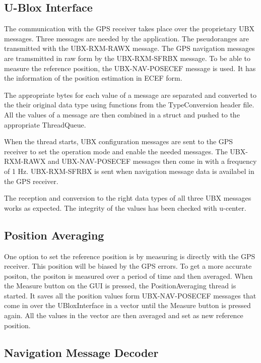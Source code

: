 \subsection{U-Blox Interface}

The communication with the GPS receiver takes place over the proprietary UBX messages.
Three messages are needed by the application.
The pseudoranges are transmitted with the UBX-RXM-RAWX message.
The GPS navigation messages are tramsmitted in raw form by the UBX-RXM-SFRBX message.
To be able to measure the reference position, the UBX-NAV-POSECEF message is used.
It has the information of the position estimation in ECEF form.

The appropriate bytes for each value of a message are separated and converted to the their original data type using functions from the TypeConversion header file.
All the values of a message are then combined in a struct and pushed to the appropriate ThreadQueue.

When the thread starts, UBX configuration messages are sent to the GPS receiver to set the operation mode and enable the needed messages.
The UBX-RXM-RAWX and UBX-NAV-POSECEF messages then come in with a frequency of 1 Hz.
UBX-RXM-SFRBX is sent when navigation message data is availabel in the GPS receiver.

The reception and conversion to the right data types of all three UBX messages works as expected.
The integrity of the values has been checked with u-center.

\subsection{Position Averaging}

One option to set the reference position is by measuring is directly with the GPS receiver.
This position will be biased by the GPS errors.
To get a more accurate positon, the positon is measured over a period of time and then averaged.
When the Measure button on the GUI is pressed, the PositionAveraging thread is started.
It saves all the position values form UBX-NAV-POSECEF messages that come in over the UBloxInterface in a vector until the Measure button is pressed again.
All the values in the vector are then averaged and set as new reference position.

\subsection{Navigation Message Decoder}

